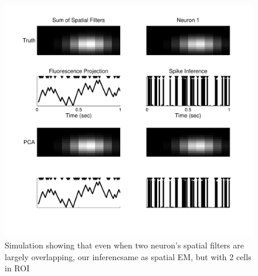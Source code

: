 \begin{figure}[H]
\centering \includegraphics[width=.9\linewidth]{../graphics/spatial_multi}
\caption{Simulation showing that even when two neuron's spatial filters are largely overlapping, our inferencsame as spatial EM, but with 2 cells in ROI} \label{fig:spatial_multi}
\end{figure}


